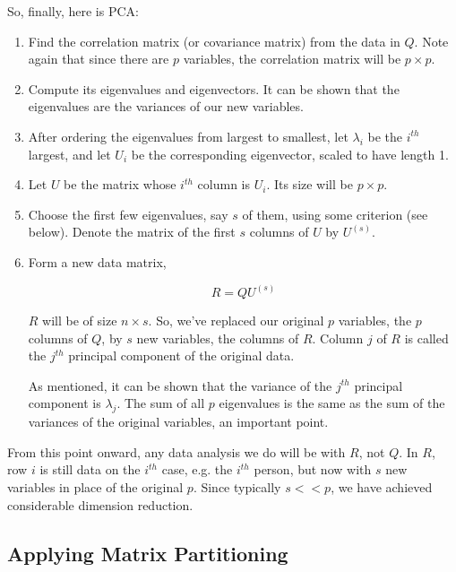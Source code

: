 So, finally, here is PCA:

\begin{enumerate}


\item Find the correlation matrix (or covariance matrix)
from the data in $Q$.  Note again that since there are $p$
variables, the correlation matrix will be $p \times p$.

\item Compute its eigenvalues and eigenvectors.  It can be shown that
the eigenvalues are the variances of our new variables.

\item After ordering the eigenvalues from largest to smallest, let
$\lambda_i$ be the $i^{th}$ largest, and let $U_i$ be the corresponding
eigenvector, scaled to have length 1.  

\item Let $U$ be the matrix whose $i^{th}$ column is $U_i$.  Its size
will be $p \times p$.

\item Choose the first few eigenvalues, say $s$ of them, using some
criterion (see below).  Denote the matrix of the first $s$ columns of $U$
by $U^{(s)}$.  

\item Form a new data matrix, 

\begin{equation}
\label{rqu}
R = Q U^{(s)}
\end{equation}

$R$ will be of size $n \times s$.  So, we've replaced our original $p$
variables, the $p$ columns of $Q$, by $s$ new variables, the columns of
$R$.  Column $j$ of $R$ is called the $j^{th}$ principal component of
the original data.  

As mentioned, it can be shown that the variance of the $j^{th}$ principal
component is $\lambda_j$.  The sum of all $p$ eigenvalues is the same as
the sum of the variances of the original variables, an important point.

\end{enumerate} 

From this point onward, any data analysis we do will be with $R$, not
$Q$.  In $R$, row $i$ is still data on the $i^{th}$ case, e.g. the
$i^{th}$ person, but now with $s$ new variables in place of the original
$p$.  Since typically $s << p$, we have achieved considerable dimension
reduction.

\subsection{Applying Matrix Partitioning}

